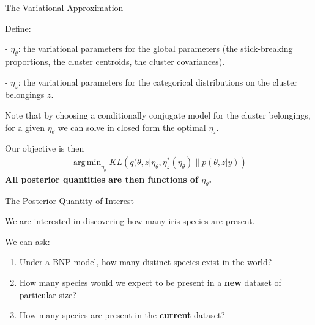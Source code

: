 \documentclass[10pt]{beamer}\usepackage[]{graphicx}\usepackage[]{color}
\DeclareMathOperator*{\argmin}{arg\,min}
\begin{document}
\begin{frame}{The Variational Approximation}

Define:

- $\eta_\theta$: the variational parameters for the global parameters
(the stick-breaking proportions, the cluster centroids, the cluster covariances).

- $\eta_z$: the variational parameters for the categorical distributions on the
cluster belongings $z$.

Note that by choosing a conditionally conjugate model for the cluster belongings,
for a given $\eta_\theta$ we can solve in closed form the optimal $\eta_z$.

\pause

Our objective is then
\begin{align*}
  \argmin_{\eta_\theta} KL\left(
      q(\theta, z \vert \eta_\theta, \eta_z^*(\eta_\theta) \big\| p(\theta, z | y)
      \right)
\end{align*}
%
{\bf All posterior quantities are then functions of $\eta_\theta$. }

\end{frame}

\begin{frame}{The Posterior Quantity of Interest}

We are interested in discovering how many iris species are present. 

\pause
We can ask: 
\begin{enumerate}[(1)]
\item Under a BNP model, how many distinct species exist in the world? 
\pause
\item How many species would we expect to be present in a {\bf new} dataset of particular size?
\pause
\item How many species are present in the {\bf current} dataset?
\end{enumerate}

\end{frame}
\end{document}
